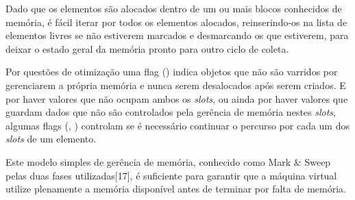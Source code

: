 Dado que os elementos são alocados dentro de um ou mais blocos conhecidos de
memória, é fácil iterar por todos os elementos alocados, reinserindo-os na
lista de elementos livres se não estiverem marcados e desmarcando os que
estiverem, para deixar o estado geral da memória pronto para outro ciclo de
coleta.

Por questões de otimização uma flag () indica objetos
que não são varridos por gerenciarem a própria memória e nunca serem
desalocados após serem criados. E por haver valores que não ocupam ambos os
\textit{slots}, ou ainda por haver valores que guardam dados que não são controlados
pela gerência de memória nestes \textit{slots}, algumas flags
(, ) controlam se é
necessário continuar o percurso por cada um dos \textit{slots} de um elemento.

Este modelo simples de gerência de memória, conhecido como Mark \& Sweep pelas
duas fases utilizadas[17], é suficiente para garantir que a máquina virtual
utilize plenamente a memória disponível antes de terminar por falta de
memória.

